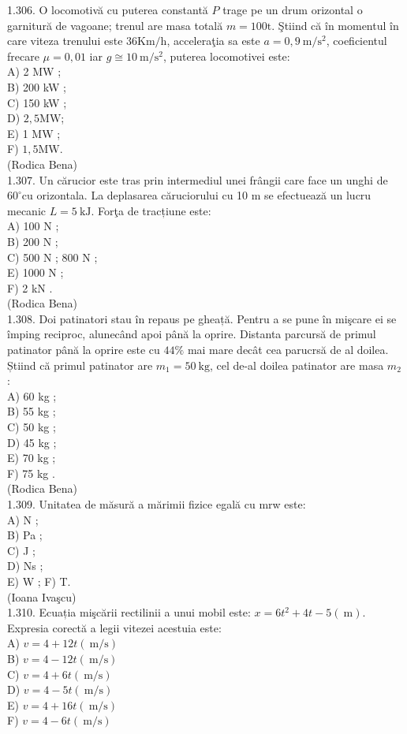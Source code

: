 \documentclass[10pt]{article}
\begin{document}
1.306. O locomotivă cu puterea constantă $P$ trage pe un drum orizontal o garnitură de vagoane; trenul are masa totală $m=100 \mathrm{t}$. Ştiind că în momentul în care viteza trenului este $36 \mathrm{Km} / \mathrm{h}$, acceleraţia sa este $a=0,9 \mathrm{~m} / \mathrm{s}^{2}$, coeficientul frecare $\mu=0,01$ iar $g \cong 10 \mathrm{~m} / \mathrm{s}^{2}$, puterea locomotivei este:\\
A) 2 MW ;\\
B) 200 kW ;\\
C) 150 kW ;\\
D) $2,5 \mathrm{MW}$;\\
E) 1 MW ;\\
F) $1,5 \mathrm{MW}$.\\
(Rodica Bena)\\
1.307. Un cărucior este tras prin intermediul unei frângii care face un unghi de $60^{\circ} \mathrm{cu}$ orizontala. La deplasarea căruciorului cu 10 m se efectuează un lucru mecanic $L=5 \mathrm{~kJ}$. Forţa de tracțiune este:\\
A) 100 N ;\\
B) 200 N ;\\
C) 500 N ; 800 N ;\\
E) 1000 N ;\\
F) 2 kN .\\
(Rodica Bena)\\
1.308. Doi patinatori stau în repaus pe gheață. Pentru a se pune în mişcare ei se împing reciproc, alunecând apoi până la oprire. Distanta parcursă de primul patinator până la oprire este cu $44 \%$ mai mare decât cea parucrsă de al doilea. Știind că primul patinator are $m_{1}=50 \mathrm{~kg}$, cel de-al doilea patinator are masa $m_{2}$ :\\
A) 60 kg ;\\
B) 55 kg ;\\
C) 50 kg ;\\
D) 45 kg ;\\
E) 70 kg ;\\
F) 75 kg .\\
(Rodica Bena)\\
1.309. Unitatea de măsură a mărimii fizice egală cu mrw este:\\
A) N ;\\
B) Pa ;\\
C) J ;\\
D) Ns ;\\
E) W ; F) T.\\
(Ioana Ivaşcu)\\
1.310. Ecuația mişcării rectilinii a unui mobil este: $x=6 t^{2}+4 t-5(\mathrm{~m})$. Expresia corectă a legii vitezei acestuia este:\\
A) $v=4+12 t(\mathrm{~m} / \mathrm{s})$\\
B) $v=4-12 t(\mathrm{~m} / \mathrm{s})$\\
C) $v=4+6 t(\mathrm{~m} / \mathrm{s})$\\
D) $v=4-5 t(\mathrm{~m} / \mathrm{s})$\\
E) $v=4+16 t(\mathrm{~m} / \mathrm{s})$\\
F) $v=4-6 t(\mathrm{~m} / \mathrm{s})$
\end{document}
